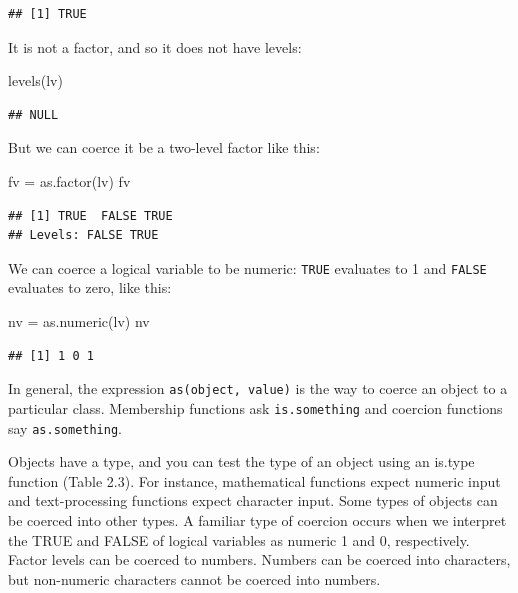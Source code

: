 \documentclass[
]{book}
\newenvironment{Shaded}{\begin{snugshade}}{\end{snugshade}}
\newcommand{\FunctionTok}[1]{\textcolor[rgb]{0.00,0.00,0.00}{#1}}
\newcommand{\NormalTok}[1]{#1}
\newcommand{\OtherTok}[1]{\textcolor[rgb]{0.56,0.35,0.01}{#1}}
\begin{document}
\begin{verbatim}
## [1] TRUE
\end{verbatim}

It is not a factor, and so it does not have levels:

\begin{Shaded}
\begin{Highlighting}[]
\FunctionTok{levels}\NormalTok{(lv)}
\end{Highlighting}
\end{Shaded}

\begin{verbatim}
## NULL
\end{verbatim}

But we can coerce it be a two-level factor like this:

\begin{Shaded}
\begin{Highlighting}[]
\NormalTok{fv }\OtherTok{=} \FunctionTok{as.factor}\NormalTok{(lv)}
\NormalTok{fv}
\end{Highlighting}
\end{Shaded}

\begin{verbatim}
## [1] TRUE  FALSE TRUE 
## Levels: FALSE TRUE
\end{verbatim}

We can coerce a logical variable to be numeric: \texttt{TRUE} evaluates to 1 and \texttt{FALSE} evaluates to zero, like this:

\begin{Shaded}
\begin{Highlighting}[]
\NormalTok{nv }\OtherTok{=} \FunctionTok{as.numeric}\NormalTok{(lv)}
\NormalTok{nv}
\end{Highlighting}
\end{Shaded}

\begin{verbatim}
## [1] 1 0 1
\end{verbatim}

In general, the expression \texttt{as(object,\ value)} is the way to coerce an object to a particular class. Membership functions ask \texttt{is.something} and coercion functions say \texttt{as.something}.

Objects have a type, and you can test the type of an object using an is.type function (Table 2.3). For instance, mathematical functions expect numeric input and text-processing functions expect character input. Some types of objects can be coerced into other types. A familiar type of coercion occurs when we interpret the TRUE and FALSE of logical variables as numeric 1 and 0, respectively. Factor levels can be coerced to numbers. Numbers can be coerced into characters, but non-numeric characters cannot be coerced into numbers.
\end{document}
